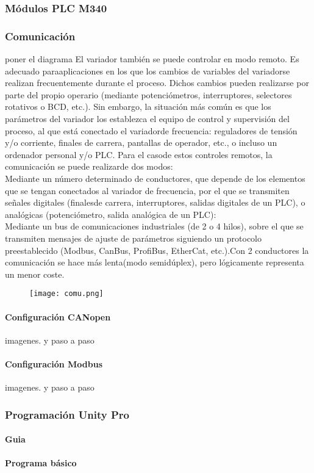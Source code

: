 \subsubsection{Módulos PLC M340}



\subsubsection{Comunicación}
poner el diagrama
%
El   variador   también   se   puede   controlar   en   modo   remoto.   Es   adecuado   paraaplicaciones en   los   que   los   cambios   de   variables   del   variadorse   realizan frecuentemente  durante  el proceso.  Dichos  cambios  pueden  realizarse  por  parte  del propio  operario  (mediante  potenciómetros,  interruptores,  selectores  rotativos  o  BCD, etc.).  Sin  embargo,  la  situación  más  común  es  que  los  parámetros  del  variador  los establezca  el  equipo  de  control  y  supervisión  del  proceso,  al  que  está  conectado  el variadorde  frecuencia: reguladores  de  tensión  y/o  corriente,  finales  de  carrera, pantallas de operador, etc., o incluso un ordenador personal y/o PLC. Para  el  casode  estos  controles  remotos,  la  comunicación  se  puede  realizarde  dos modos:\\Mediante un  número  determinado  de  conductores,  que  depende  de  los elementos que se tengan conectados al variador de frecuencia, por el que se transmiten señales digitales (finalesde carrera, interruptores, salidas digitales de un PLC), o analógicas (potenciómetro, salida analógica de un PLC):\\Mediante un bus de comunicaciones industriales (de 2 o 4 hilos), sobre el que se transmiten   mensajes   de   ajuste   de   parámetros   siguiendo   un   protocolo preestablecido (Modbus, CanBus, ProfiBus, EtherCat, etc.).Con 2  conductores la  comunicación  se  hace  más  lenta(modo  semidúplex),  pero  lógicamente representa un menor coste.
	
	\begin{figure}[htb]
		\centering
		\texttt{[image: comu.png]}
	\end{figure}	
	

	\paragraph{Configuración CANopen}
	imagenes. y paso a paso
	\paragraph{Configuración Modbus}
	imagenes. y paso a paso

	\subsubsection{Programación Unity Pro}
	\paragraph{Guia}
	\paragraph{Programa básico}
	\newpage

